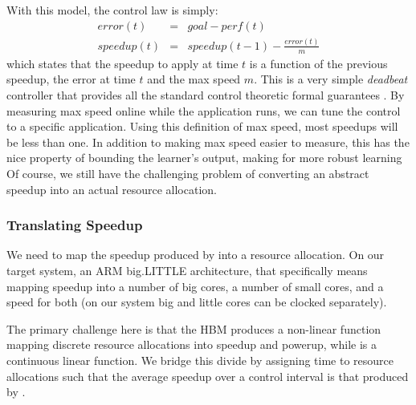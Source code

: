 With this model, the control law is simply:
\begin{eqnarray}
  error(t) &=& goal - perf(t) \label{eqn:speedup-error} \\
  speedup(t) &=& speedup(t-1) - \frac{error(t)}{m}
  \label{eqn:speedup-control}
\end{eqnarray}
which states that the speedup to apply at time $t$ is a function of
the previous speedup, the error at time $t$ and the max speed $m$.
This is a very simple \emph{deadbeat} controller that provides all the
standard control theoretic formal guarantees
\cite{controlhandbook,seec-scs2010}.  By measuring max speed online
while the application runs, we can tune the control to a specific
application.  Using this definition of max speed, most
speedups will be less than one.  In addition to making max speed
easier to measure, this has the nice property of bounding the
learner's output, making for more robust learning  Of
course, we still have the challenging problem of converting an
abstract speedup into an actual resource allocation.


\subsubsection{Translating Speedup}
We need to map the speedup produced by  into a
resource allocation.  On our target system, an ARM big.LITTLE
architecture, that specifically means mapping speedup into a number of
big cores, a number of small cores, and a speed for both (on our
system big and little cores can be clocked separately).

The primary challenge here is that the HBM produces a non-linear
function mapping discrete resource allocations into speedup and
powerup, while  is a continuous linear
function.  We bridge this divide by assigning time to resource
allocations such that the average speedup over a control interval is
that produced by .

